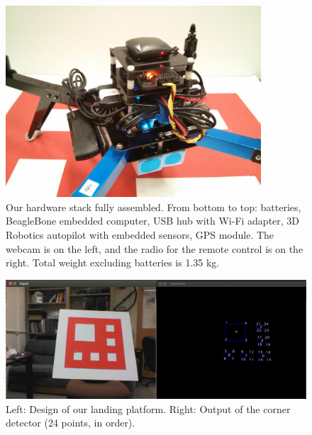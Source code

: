 \documentclass[10pt]{scrartcl} %
\begin{document}
\begin{figure}[h!]
\centering
\includegraphics[width=0.85\textwidth]{images/hardware.jpg}
\caption{
    Our hardware stack fully assembled. From bottom to top: batteries,
    BeagleBone embedded computer, USB hub with Wi-Fi adapter, 3D
    Robotics autopilot with embedded sensors, GPS module. The
    webcam is on the left, and the radio for the remote control is on
    the right. Total weight excluding batteries is 1.35 kg.
}
\label{fig:hardware-photo}
\end{figure}

\begin{figure}[h]
    \centering
    \includegraphics[width=\textwidth]{images/corners.png}
    \caption{
        Left: Design of our landing platform.
        Right: Output of the corner detector (24 points, in order).
    }
    \label{fig:corners}
\end{figure}
\end{document}
